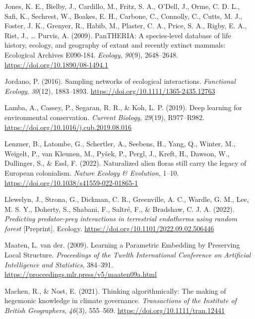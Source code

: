 \documentclass[11pt]{article}
\newlength{\cslhangindent}
\newenvironment{CSLReferences}[2] %
 {%
  \setlength{\parindent}{0pt}
  \ifodd #1 \everypar{\setlength{\hangindent}{\cslhangindent}}\ignorespaces\fi
  \ifnum #2 > 0
  \setlength{\parskip}{#2\baselineskip}
  \fi
 }%
 {}
\begin{document}
\begin{CSLReferences}{1}{0}
\leavevmode{}%
Jones, K. E., Bielby, J., Cardillo, M., Fritz, S. A., O'Dell, J., Orme,
C. D. L., Safi, K., Sechrest, W., Boakes, E. H., Carbone, C., Connolly,
C., Cutts, M. J., Foster, J. K., Grenyer, R., Habib, M., Plaster, C. A.,
Price, S. A., Rigby, E. A., Rist, J., \ldots{} Purvis, A. (2009).
PanTHERIA: A species‐level database of life history, ecology, and
geography of extant and recently extinct mammals: Ecological Archives
E090‐184. \emph{Ecology}, \emph{90}(9), 2648--2648.
\url{https://doi.org/10.1890/08-1494.1}

\leavevmode{}%
Jordano, P. (2016). Sampling networks of ecological interactions.
\emph{Functional Ecology}, \emph{30}(12), 1883--1893.
\url{https://doi.org/10.1111/1365-2435.12763}

\leavevmode{}%
Lamba, A., Cassey, P., Segaran, R. R., \& Koh, L. P. (2019). Deep
learning for environmental conservation. \emph{Current Biology},
\emph{29}(19), R977--R982.
\url{https://doi.org/10.1016/j.cub.2019.08.016}

\leavevmode{}%
Lenzner, B., Latombe, G., Schertler, A., Seebens, H., Yang, Q., Winter,
M., Weigelt, P., van Kleunen, M., Pyšek, P., Pergl, J., Kreft, H.,
Dawson, W., Dullinger, S., \& Essl, F. (2022). Naturalized alien floras
still carry the legacy of European colonialism. \emph{Nature Ecology \&
Evolution}, 1--10. \url{https://doi.org/10.1038/s41559-022-01865-1}

\leavevmode{}%
Llewelyn, J., Strona, G., Dickman, C. R., Greenville, A. C., Wardle, G.
M., Lee, M. S. Y., Doherty, S., Shabani, F., Saltré, F., \& Bradshaw, C.
J. A. (2022). \emph{Predicting predator-prey interactions in terrestrial
endotherms using random forest} {[}Preprint{]}. Ecology.
\url{https://doi.org/10.1101/2022.09.02.506446}

\leavevmode{}%
Maaten, L. van der. (2009). Learning a Parametric Embedding by
Preserving Local Structure. \emph{Proceedings of the Twelth
International Conference on Artificial Intelligence and Statistics},
384--391. \url{https://proceedings.mlr.press/v5/maaten09a.html}

\leavevmode{}%
Machen, R., \& Nost, E. (2021). Thinking algorithmically: The making of
hegemonic knowledge in climate governance. \emph{Transactions of the
Institute of British Geographers}, \emph{46}(3), 555--569.
\url{https://doi.org/10.1111/tran.12441}


\end{CSLReferences}
\end{document}
